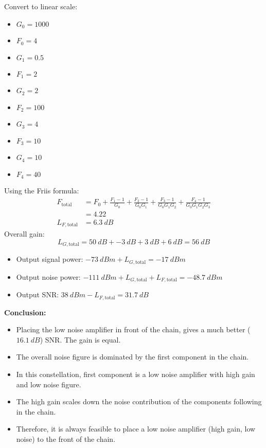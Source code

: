 \begin{solution}
\begin{tasks}
		\task
		Convert to linear scale:
		\begin{itemize}
			\item $G_0 = 1000$
			\item $F_0 = 4$
			\item $G_1 = 0.5$
			\item $F_1 = 2$
			\item $G_2 = 2$
			\item $F_2 = 100$
			\item $G_3 = 4$
			\item $F_3 = 10$
			\item $G_4 = 10$
			\item $F_4 = 40$
		\end{itemize}
	
		Using the Friis formula:
		\begin{equation*}
			\begin{split}
				F_{\text{total}} &= F_0 + \frac{F_1 - 1}{G_0} + \frac{F_2 - 1}{G_0 G_1} + \frac{F_3 - 1}{G_0 G_1 G_2} + \frac{F_4 - 1}{G_0 G_1 G_2 G_3} \\
				 &= 4.22 \\
				L_{F,\text{total}} &= \SI{6.3}{dB}
			\end{split}
		\end{equation*}
		Overall gain:
		\begin{equation*}
			L_{G,\text{total}} = \SI{50}{dB} + \SI{-3}{dB} + \SI{3}{dB} + \SI{6}{dB} = \SI{56}{dB}
		\end{equation*}
		\begin{itemize}
			\item Output signal power: $\SI{-73}{dBm} + L_{G,\text{total}} = \SI{-17}{dBm}$
			\item Output noise power: $\SI{-111}{dBm} + L_{G,\text{total}} + L_{F,\text{total}} = \SI{-48.7}{dBm}$
			\item Output SNR: $\SI{38}{dBm} - L_{F,\text{total}} = \SI{31.7}{dB}$
		\end{itemize}
	
		\textbf{Conclusion:}
		\begin{itemize}
			\item Placing the low noise amplifier in front of the chain, gives a much better ($\SI{16.1}{dB}$) SNR. The gain is equal.
			\item The overall noise figure is dominated by the first component in the chain.
			\item In this constellation, first component is a low noise amplifier with high gain and low noise figure.
			\item The high gain scales down the noise contribution of the components following in the chain.
			\item Therefore, it is always feasible to place a low noise amplifier (high gain, low noise) to the front of the chain.
		\end{itemize}
	\end{tasks}
\end{solution}



